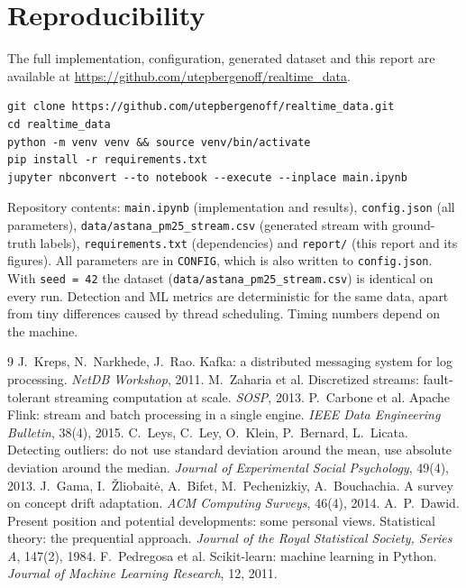 \documentclass[11pt]{article}
\begin{document}
\section*{Reproducibility}
The full implementation, configuration, generated dataset and this report are available at \url{https://github.com/utepbergenoff/realtime_data}.
\begin{verbatim}
git clone https://github.com/utepbergenoff/realtime_data.git
cd realtime_data
python -m venv venv && source venv/bin/activate
pip install -r requirements.txt
jupyter nbconvert --to notebook --execute --inplace main.ipynb
\end{verbatim}
Repository contents: \texttt{main.ipynb} (implementation and results), \texttt{config.json} (all parameters), \texttt{data/astana\_pm25\_stream.csv} (generated stream with ground-truth labels), \texttt{requirements.txt} (dependencies) and \texttt{report/} (this report and its figures).
All parameters are in \texttt{CONFIG}, which is also written to \texttt{config.json}. With \texttt{seed = 42} the dataset (\texttt{data/astana\_pm25\_stream.csv}) is identical on every run. Detection and ML metrics are deterministic for the same data, apart from tiny differences caused by thread scheduling. Timing numbers depend on the machine.

\begin{thebibliography}{9}
 J.~Kreps, N.~Narkhede, J.~Rao. Kafka: a distributed messaging system for log processing. \emph{NetDB Workshop}, 2011.
 M.~Zaharia et al. Discretized streams: fault-tolerant streaming computation at scale. \emph{SOSP}, 2013.
 P.~Carbone et al. Apache Flink: stream and batch processing in a single engine. \emph{IEEE Data Engineering Bulletin}, 38(4), 2015.
 C.~Leys, C.~Ley, O.~Klein, P.~Bernard, L.~Licata. Detecting outliers: do not use standard deviation around the mean, use absolute deviation around the median. \emph{Journal of Experimental Social Psychology}, 49(4), 2013.
 J.~Gama, I.~\v{Z}liobait\.{e}, A.~Bifet, M.~Pechenizkiy, A.~Bouchachia. A survey on concept drift adaptation. \emph{ACM Computing Surveys}, 46(4), 2014.
 A.~P.~Dawid. Present position and potential developments: some personal views. Statistical theory: the prequential approach. \emph{Journal of the Royal Statistical Society, Series A}, 147(2), 1984.
 F.~Pedregosa et al. Scikit-learn: machine learning in Python. \emph{Journal of Machine Learning Research}, 12, 2011.
\end{thebibliography}
\end{document}
